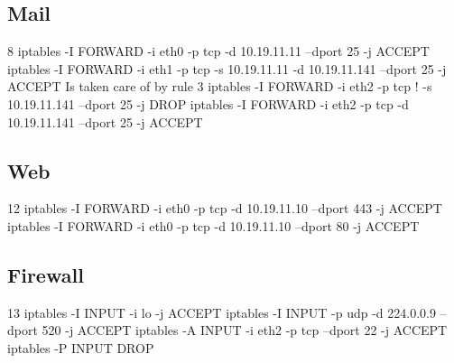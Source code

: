 \documentclass[12pt]{article}
\begin{document}
\subsection*{Mail}
8\newline
iptables -I FORWARD -i eth0 -p tcp -d 10.19.11.11 --dport 25 -j ACCEPT\newline
{}\newline
iptables -I FORWARD -i eth1 -p tcp -s 10.19.11.11 -d 10.19.11.141 --dport 25 -j ACCEPT\newline
{}\newline
Is taken care of by rule 3\newline
{}\newline
iptables -I FORWARD -i eth2 -p tcp ! -s 10.19.11.141 --dport 25 -j DROP\newline
iptables -I FORWARD -i eth2 -p tcp -d 10.19.11.141 --dport 25 -j ACCEPT\newline
\newline

\subsection*{Web}
12\newline
iptables -I FORWARD -i eth0 -p tcp -d 10.19.11.10 --dport 443 -j ACCEPT\newline
iptables -I FORWARD -i eth0 -p tcp -d 10.19.11.10 --dport 80 -j ACCEPT\newline

\subsection*{Firewall}
13\newline
iptables -I INPUT -i lo -j ACCEPT\newline
{}\newline
iptables -I INPUT -p udp -d 224.0.0.9 --dport 520 -j ACCEPT\newline
{}\newline
iptables -A INPUT -i eth2 -p tcp --dport 22 -j ACCEPT\newline
{}\newline
iptables -P INPUT DROP\newline
\end{document}
